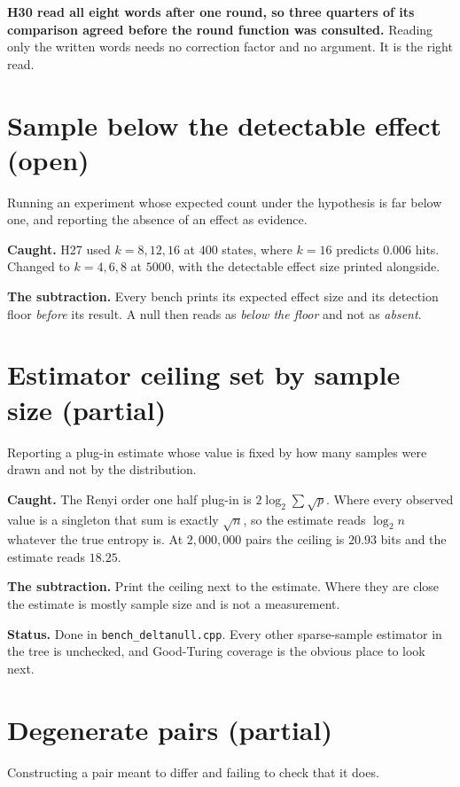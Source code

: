 \textbf{H30 read all eight words after one round, so three quarters of its comparison agreed before the round function was consulted.} Reading only the written words needs no correction factor and no argument. It is the right read.

\section{Sample below the detectable effect (open)}

Running an experiment whose expected count under the hypothesis is far below one, and reporting the absence of an effect as evidence.

\textbf{Caught.} H27 used \(k = 8, 12, 16\) at \(400\) states, where \(k = 16\) predicts \(0.006\) hits. Changed to \(k = 4, 6, 8\) at \(5000\), with the detectable effect size printed alongside.

\textbf{The subtraction.} Every bench prints its expected effect size and its detection floor \emph{before} its result. A null then reads as \emph{below the floor} and not as \emph{absent}.

\section{Estimator ceiling set by sample size (partial)}

Reporting a plug-in estimate whose value is fixed by how many samples were drawn and not by the distribution.

\textbf{Caught.} The Renyi order one half plug-in is \(2 \log_2 \sum \sqrt{p}\). Where every observed value is a singleton that sum is exactly \(\sqrt{n}\), so the estimate reads \(\log_2 n\) whatever the true entropy is. At \(2{,}000{,}000\) pairs the ceiling is \(20.93\) bits and the estimate reads \(18.25\).

\textbf{The subtraction.} Print the ceiling next to the estimate. Where they are close the estimate is mostly sample size and is not a measurement.

\textbf{Status.} Done in \texttt{bench\_deltanull.cpp}. Every other sparse-sample estimator in the tree is unchecked, and Good-Turing coverage is the obvious place to look next.

\section{Degenerate pairs (partial)}

Constructing a pair meant to differ and failing to check that it does.

